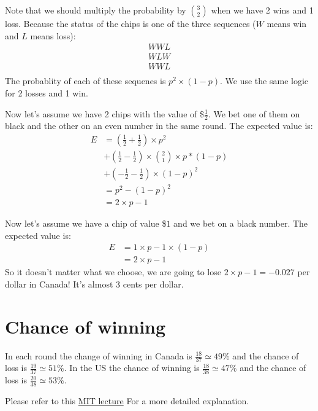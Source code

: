\documentclass{book}
\begin{document}
	Note that we should multiply the probability by $\binom{3}{2}$ when we have 2 wins and 1 loss. Because the status of the chips is one of the three sequences ($W$ means win and $L$ means loss):
	\begin{equation*}
		\begin{split}
		WWL \\
		WLW \\
		WWL \\
		\end{split}		
	\end{equation*}
	The probablity of each of these sequenes is $p^2 \times (1 - p)$. We use the same logic for 2 losses and 1 win.
	\par Now let's assume we have 2 chips with the value of \$$\frac{1}{2}$. We bet one of them on black and the other on an even number in the same round. The expected value is:
	\begin{equation*}
		\begin{split}
			E &= (\frac{1}{2} + \frac{1}{2}) \times p^2 \\
			&+ (\frac{1}{2} - \frac{1}{2}) \times \binom{2}{1} \times p * (1 - p) \\
			&+(-\frac{1}{2} - \frac{1}{2}) \times (1 - p)^2 \\
			&= p^2 - (1 - p)^2 \\
			&= 2 \times p - 1
		\end{split}
	\end{equation*}
	\par Now let's assume we have a chip of value \$$1$ and we bet on a black number. The expected value is:
	\begin{equation*}
		\begin{split}
			E &= 1 \times p - 1 \times (1 - p) \\
			&= 2 \times p - 1			
		\end{split}
	\end{equation*}
	So it doesn't matter what we choose, we are going to lose $2 \times p - 1 = -0.027$ per dollar in Canada! It's almost $3$ cents per dollar.
	\section{Chance of winning}
	In each round the change of winning in Canada is $\frac{18}{37} \simeq 49\%$ and the chance of loss is $\frac{19}{37} \simeq 51\%$. In the US the chance of winning is $\frac{18}{38} \simeq 47\%$ and the chance of loss is $\frac{20}{38} \simeq 53\%$.
	\par Please refer to this \href{https://www.youtube.com/watch?v=56iFMY8QW2k}{MIT lecture} For a more detailed explanation.
\end{document}
